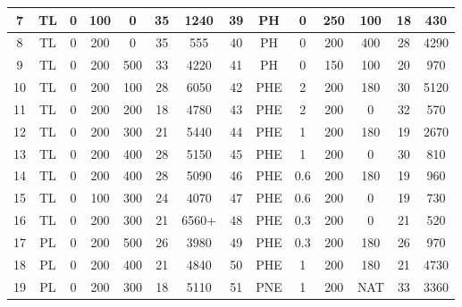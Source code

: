 \begin{table}[p]
\begin{tabular}{|c|c|c|c|c|c|c||c|c|c|c|c|c|c|}
7    & TL      & 0     & 100        & 0         & 35         & 1240           &   39   & PH      & 0     & 250        & 100       & 18         & 430         \\ \hline
8    & TL      & 0     & 200        & 0         & 35         & 555            &   40   & PH      & 0     & 200        & 400       & 28         & 4290        \\ \hline
9    & TL      & 0     & 200        & 500       & 33         & 4220           &   41   & PH      & 0     & 150        & 100       & 20         & 970         \\ \hline
10   & TL      & 0     & 200        & 100       & 28         & 6050           &   42   & PHE     & 2     & 200        & 180       & 30         & 5120        \\ \hline
11   & TL      & 0     & 200        & 200       & 18         & 4780           &   43   & PHE     & 2     & 200        & 0         & 32         & 570         \\ \hline
12   & TL      & 0     & 200        & 300       & 21         & 5440           &   44   & PHE     & 1     & 200        & 180       & 19         & 2670        \\ \hline
13   & TL      & 0     & 200        & 400       & 28         & 5150           &   45   & PHE     & 1     & 200        & 0         & 30         & 810         \\ \hline
14   & TL      & 0     & 200        & 400       & 28         & 5090           &   46   & PHE     & 0.6   & 200        & 180       & 19         & 960         \\ \hline
15   & TL      & 0     & 100        & 300       & 24         & 4070           &   47   & PHE     & 0.6   & 200        & 0         & 19         & 730         \\ \hline
16   & TL      & 0     & 200        & 300       & 21         & 6560+          &   48   & PHE     & 0.3   & 200        & 0         & 21         & 520         \\ \hline
17   & PL      & 0     & 200        & 500       & 26         & 3980           &   49   & PHE     & 0.3   & 200        & 180       & 26         & 970         \\ \hline
18   & PL      & 0     & 200        & 400       & 21         & 4840           &   50   & PHE     & 1     & 200        & 180       & 21         & 4730        \\ \hline
19   & PL      & 0     & 200        & 300       & 18         & 5110           &   51   & PNE     & 1     & 200        & NAT       & 33         & 3360        \\ \hline

\end{tabular}
\end{table}
